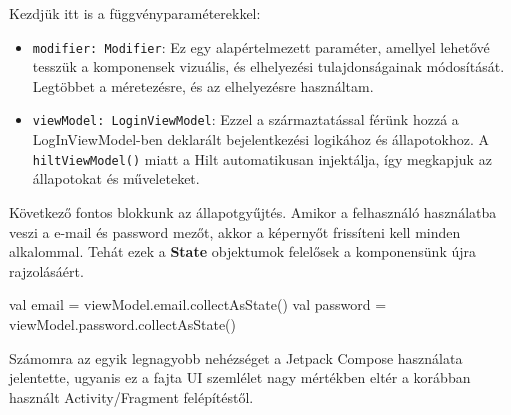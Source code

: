Kezdjük itt is a függvényparaméterekkel:
\begin{itemize}
    \item \texttt{modifier: Modifier}: Ez egy alapértelmezett paraméter, amellyel lehetővé 
    \newline
    tesszük a komponensek vizuális, és elhelyezési tulajdonságainak módosítását. Legtöbbet a méretezésre, és az elhelyezésre használtam.
    \item \texttt{viewModel: LoginViewModel}: Ezzel a származtatással férünk hozzá a 
    \newline
    LogInViewModel-ben deklarált bejelentkezési logikához és állapotokhoz. 
    \newline
    A \texttt{hiltViewModel()} miatt a Hilt automatikusan injektálja, így megkapjuk az állapotokat és műveleteket.
\end{itemize}

Következő fontos blokkunk az állapotgyűjtés. Amikor a felhasználó használatba veszi a e-mail és password mezőt, akkor a képernyőt frissíteni kell minden alkalommal. Tehát ezek a \textbf{State} objektumok felelősek a komponensünk újra rajzolásáért.

\begin{java}[caption = {E-mail, és jelszó State objetumok.}]
val email = viewModel.email.collectAsState()
val password = viewModel.password.collectAsState()
\end{java}

Számomra az egyik legnagyobb nehézséget a Jetpack Compose használata jelentette, ugyanis ez a 
fajta UI szemlélet nagy mértékben eltér a korábban használt Activity/Fragment felépítéstől.

